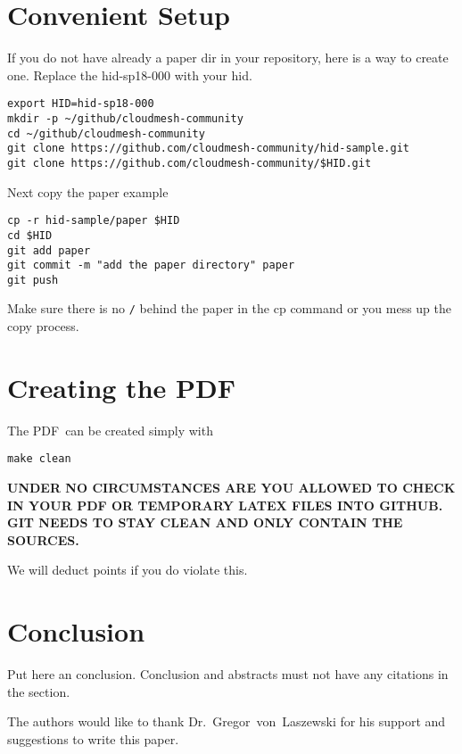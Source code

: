 \section{Convenient Setup}

If you do not have already a paper dir in your repository, here is a
way to create one. Replace the hid-sp18-000 with your hid.

\begin{verbatim}
export HID=hid-sp18-000
mkdir -p ~/github/cloudmesh-community
cd ~/github/cloudmesh-community
git clone https://github.com/cloudmesh-community/hid-sample.git
git clone https://github.com/cloudmesh-community/$HID.git
\end{verbatim}

Next copy the paper example

\begin{verbatim}
cp -r hid-sample/paper $HID
cd $HID
git add paper
git commit -m "add the paper directory" paper
git push
\end{verbatim}

Make sure there is no \verb|/| behind the paper in the cp command or you mess up the
copy process.


\section{Creating the PDF}

The PDF\ can be created simply with 

\begin{verbatim}
make clean
\end{verbatim}



{\bf UNDER NO CIRCUMSTANCES ARE YOU ALLOWED TO CHECK IN YOUR PDF OR
  TEMPORARY LATEX FILES INTO GITHUB. GIT NEEDS TO STAY CLEAN AND ONLY
  CONTAIN THE SOURCES.}

We will deduct points if you do violate this.

\section{Conclusion}

Put here an conclusion. Conclusion and abstracts must not have any
citations in the section.


\begin{acks}

  The authors would like to thank Dr.~Gregor~von~Laszewski for his
  support and suggestions to write this paper.

\end{acks}


 


